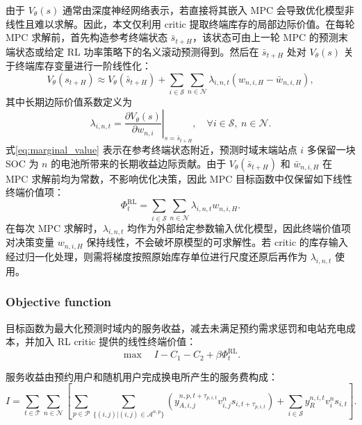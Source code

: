 \documentclass[12pt,hyperref,a4paper,UTF8]{ctexart}
\begin{document}
由于 $V_{\theta}(s)$ 通常由深度神经网络表示，若直接将其嵌入 MPC 会导致优化模型非线性且难以求解。因此，本文仅利用 critic 提取终端库存的局部边际价值。在每轮 MPC 求解前，首先构造参考终端状态 $\bar{s}_{t+H}$，该状态可由上一轮 MPC 的预测末端状态或给定 RL 功率策略下的名义滚动预测得到。然后在 $\bar{s}_{t+H}$ 处对 $V_{\theta}(s)$ 关于终端库存变量进行一阶线性化：
\begin{equation}
V_{\theta}(s_{t+H})
\approx
V_{\theta}(\bar{s}_{t+H})+
\sum_{i\in\mathcal{S}}\sum_{n\in\mathcal{N}}
\lambda_{i,n,t}\left(w_{n,i,H}-\bar{w}_{n,i,H}\right),
\label{eq:value_linearization}
\end{equation}
其中长期边际价值系数定义为
\begin{equation}
\lambda_{i,n,t}
=
\left.
\frac{\partial V_{\theta}(s)}{\partial w_{n,i}}
\right|_{s=\bar{s}_{t+H}},
\quad \forall i\in\mathcal{S},\ n\in\mathcal{N}.
\label{eq:marginal_value}
\end{equation}
式\eqref{eq:marginal_value} 表示在参考终端状态附近，预测时域末端站点 $i$ 多保留一块 SOC 为 $n$ 的电池所带来的长期收益边际贡献。由于 $V_{\theta}(\bar{s}_{t+H})$ 和 $\bar{w}_{n,i,H}$ 在 MPC 求解前均为常数，不影响优化决策，因此 MPC 目标函数中仅保留如下线性终端价值项：
\begin{equation}
\Phi^{\mathrm{RL}}_t
=
\sum_{i\in\mathcal{S}}\sum_{n\in\mathcal{N}}
\lambda_{i,n,t}w_{n,i,H}.
\label{eq:rl_terminal_value}
\end{equation}
在每次 MPC 求解时，$\lambda_{i,n,t}$ 均作为外部给定参数输入优化模型，因此终端价值项对决策变量 $w_{n,i,H}$ 保持线性，不会破坏原模型的可求解性。若 critic 的库存输入经过归一化处理，则需将梯度按照原始库存单位进行尺度还原后再作为 $\lambda_{i,n,t}$ 使用。

\subsubsection{Objective function}

目标函数为最大化预测时域内的服务收益，减去未满足预约需求惩罚和电站充电成本，并加入 RL critic 提供的线性终端价值：
\begin{equation}
\max \quad I-C_1-C_2+\beta\Phi^{\mathrm{RL}}_t.
\label{eq:objective}
\end{equation}

服务收益由预约用户和随机用户完成换电所产生的服务费构成：
\begin{equation}
I=\sum_{t \in \mathcal{T}}  \sum_{n \in \mathcal{N}} 
\left[  
\sum_{p \in \mathcal{P}} 
\sum_{\{(i,j) | (i,j) \in \mathcal{A}^{n,p}\}} 
\left ( y^{n,p,t+\tau_{p,i,t}}_{A,i,j}v^{n}_{i,j}s_{i,t+\tau_{p,i,t}} \right )
+\sum_{i \in \mathcal{S}} y_{R}^{n,i,t}v^n_is_{i,t}
\right].
\label{eq:income}
\end{equation}
\end{document}

